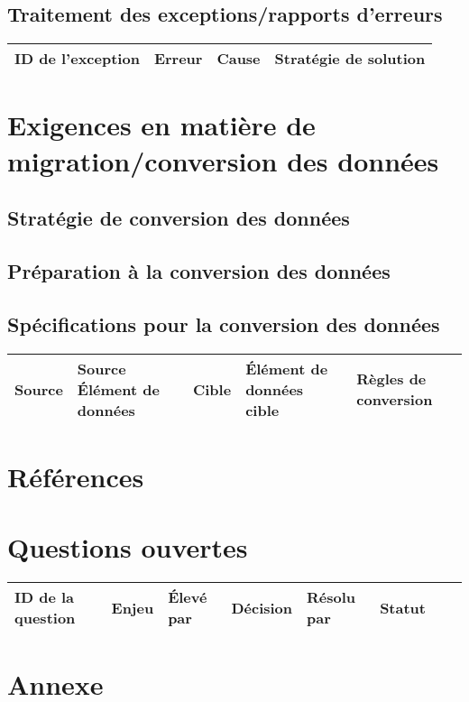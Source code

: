 \documentclass[a4paper,12pt]{report}  %
\begin{document}
	\subsection{Traitement des exceptions/rapports d'erreurs}
	
	\begin{longtable}{|l|l|l|l|}
		\hline
		\textbf{ID de l'exception} & \textbf{Erreur} & \textbf{Cause} & \textbf{Stratégie de solution} \\
		\hline
	\end{longtable}
	
	\section{Exigences en matière de migration/conversion des données}
	
	\subsection{Stratégie de conversion des données}
	
	\subsection{Préparation à la conversion des données}
	
	\subsection{Spécifications pour la conversion des données}
	\begin{longtable}{|l|l|l|l|l|}
		\hline
		\textbf{Source} & \textbf{Source Élément de données} & \textbf{Cible} & \textbf{Élément de données cible} & \textbf{Règles de conversion} \\
		\hline
	\end{longtable}
	
	\section{Références}
	
	\section{Questions ouvertes}
	\begin{longtable}{|l|l|l|l|l|l|l|l|}
		\hline
		\textbf{ID de la question} & \textbf{Enjeu} & \textbf{Élevé par} & \textbf{Décision} & \textbf{Résolu par} & \textbf{Statut} \\
		\hline
	\end{longtable}
	
	\section{Annexe}
	
\end{document}
